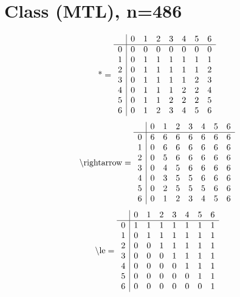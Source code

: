 \documentclass[11pt]{article}
\begin{document}
\section{Class (MTL), n=486}
\[\text{*} = 
\begin{array}{r | r r r r r r r}
 & 0 & 1 & 2 & 3 & 4 & 5 & 6 \\ \hline
0 & 0 & 0 & 0 & 0 & 0 & 0 & 0 \\
1 & 0 & 1 & 1 & 1 & 1 & 1 & 1 \\
2 & 0 & 1 & 1 & 1 & 1 & 1 & 2 \\
3 & 0 & 1 & 1 & 1 & 1 & 2 & 3 \\
4 & 0 & 1 & 1 & 1 & 2 & 2 & 4 \\
5 & 0 & 1 & 1 & 2 & 2 & 2 & 5 \\
6 & 0 & 1 & 2 & 3 & 4 & 5 & 6 \\
\end{array}
\]
\[\text{\textbackslash rightarrow} = 
\begin{array}{r | r r r r r r r}
 & 0 & 1 & 2 & 3 & 4 & 5 & 6 \\ \hline
0 & 6 & 6 & 6 & 6 & 6 & 6 & 6 \\
1 & 0 & 6 & 6 & 6 & 6 & 6 & 6 \\
2 & 0 & 5 & 6 & 6 & 6 & 6 & 6 \\
3 & 0 & 4 & 5 & 6 & 6 & 6 & 6 \\
4 & 0 & 3 & 5 & 5 & 6 & 6 & 6 \\
5 & 0 & 2 & 5 & 5 & 5 & 6 & 6 \\
6 & 0 & 1 & 2 & 3 & 4 & 5 & 6 \\
\end{array}
\]
\[\text{\textbackslash le} = 
\begin{array}{r | r r r r r r r}
 & 0 & 1 & 2 & 3 & 4 & 5 & 6 \\ \hline
0 & 1 & 1 & 1 & 1 & 1 & 1 & 1 \\
1 & 0 & 1 & 1 & 1 & 1 & 1 & 1 \\
2 & 0 & 0 & 1 & 1 & 1 & 1 & 1 \\
3 & 0 & 0 & 0 & 1 & 1 & 1 & 1 \\
4 & 0 & 0 & 0 & 0 & 1 & 1 & 1 \\
5 & 0 & 0 & 0 & 0 & 0 & 1 & 1 \\
6 & 0 & 0 & 0 & 0 & 0 & 0 & 1 \\
\end{array}
\]
\end{document}
